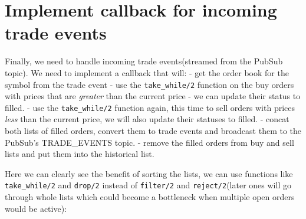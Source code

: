 \documentclass[
  oneside]{book}
\begin{document}
\hypertarget{implement-callback-for-incoming-trade-events}{%
\section{Implement callback for incoming trade events}\label{implement-callback-for-incoming-trade-events}}

Finally, we need to handle incoming trade events(streamed from the PubSub topic). We need to implement a callback that will:
- get the order book for the symbol from the trade event
- use the \texttt{take\_while/2} function on the buy orders with prices that are \emph{greater} than the current price - we can update their status to filled.
- use the \texttt{take\_while/2} function again, this time to sell orders with prices \emph{less} than the current price, we will also update their statuses to filled.
- concat both lists of filled orders, convert them to trade events and broadcast them to the PubSub's TRADE\_EVENTS topic.
- remove the filled orders from buy and sell lists and put them into the historical list.

Here we can clearly see the benefit of sorting the lists, we can use functions like \texttt{take\_while/2} and \texttt{drop/2} instead of \texttt{filter/2}
and \texttt{reject/2}(later ones will go through whole lists which could become a bottleneck when multiple open orders would be active):
\end{document}
